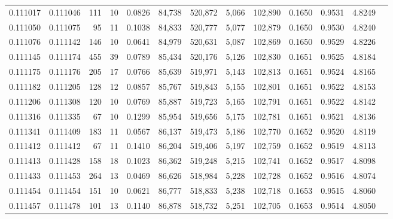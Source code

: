 \begin{tabular}{rrrrrrrrrrrrr}
0.111017 & 0.111046 &   111 &  10 &                                     0.0826 &  84,738 & 520,872 &   5,066 & 102,890 & 0.1650 & 0.9531 & 4.8249 \\
0.111050 & 0.111075 &    95 &  11 &                                     0.1038 &  84,833 & 520,777 &   5,077 & 102,879 & 0.1650 & 0.9530 & 4.8240 \\
0.111076 & 0.111142 &   146 &  10 &                                     0.0641 &  84,979 & 520,631 &   5,087 & 102,869 & 0.1650 & 0.9529 & 4.8226 \\
0.111145 & 0.111174 &   455 &  39 &                                     0.0789 &  85,434 & 520,176 &   5,126 & 102,830 & 0.1651 & 0.9525 & 4.8184 \\
0.111175 & 0.111176 &   205 &  17 &                                     0.0766 &  85,639 & 519,971 &   5,143 & 102,813 & 0.1651 & 0.9524 & 4.8165 \\
0.111182 & 0.111205 &   128 &  12 &                                     0.0857 &  85,767 & 519,843 &   5,155 & 102,801 & 0.1651 & 0.9522 & 4.8153 \\
0.111206 & 0.111308 &   120 &  10 &                                     0.0769 &  85,887 & 519,723 &   5,165 & 102,791 & 0.1651 & 0.9522 & 4.8142 \\
0.111316 & 0.111335 &    67 &  10 &                                     0.1299 &  85,954 & 519,656 &   5,175 & 102,781 & 0.1651 & 0.9521 & 4.8136 \\
0.111341 & 0.111409 &   183 &  11 &                                     0.0567 &  86,137 & 519,473 &   5,186 & 102,770 & 0.1652 & 0.9520 & 4.8119 \\
0.111412 & 0.111412 &    67 &  11 &                                     0.1410 &  86,204 & 519,406 &   5,197 & 102,759 & 0.1652 & 0.9519 & 4.8113 \\
0.111413 & 0.111428 &   158 &  18 &                                     0.1023 &  86,362 & 519,248 &   5,215 & 102,741 & 0.1652 & 0.9517 & 4.8098 \\
0.111433 & 0.111453 &   264 &  13 &                                     0.0469 &  86,626 & 518,984 &   5,228 & 102,728 & 0.1652 & 0.9516 & 4.8074 \\
0.111454 & 0.111454 &   151 &  10 &                                     0.0621 &  86,777 & 518,833 &   5,238 & 102,718 & 0.1653 & 0.9515 & 4.8060 \\
0.111457 & 0.111478 &   101 &  13 &                                     0.1140 &  86,878 & 518,732 &   5,251 & 102,705 & 0.1653 & 0.9514 & 4.8050 \\

\end{tabular}
